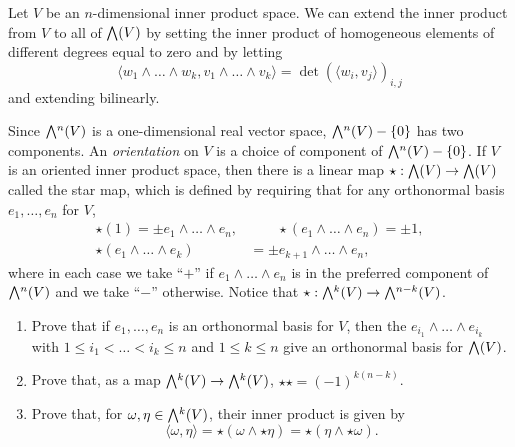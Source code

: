 \documentclass[12pt]{memoir}
\begin{document}
\begin{Ej}
    Let $V$ be an $n$-dimensional inner product space. We can extend the inner product from $V$ to all of $\exterior(V)$ by setting the inner product of homogeneous elements of different degrees equal to zero and by letting
	\[
		\langle w_1 \wedge \ldots \wedge w_k, v_1 \wedge \ldots \wedge v_k \rangle = \det \left(\langle w_i, v_j \rangle \right)_{i,j}
	\]
	and extending bilinearly. 
	
	Since $\exterior^n(V)$ is a one-dimensional real vector space, $\exterior^n(V) - \{0\}$ has two components. An \emph{orientation} on $V$ is a choice of component of $\exterior^n(V) - \{0\}$. If $V$ is an oriented inner product space, then there is a linear map $\star: \exterior(V) \to \exterior(V)$ called the star map, which is defined by requiring that for any orthonormal basis $e_1, \ldots , e_n$ for $V$,
	\begin{align*}
		\star(1) = \pm e_1 \wedge \ldots \wedge e_n,  & \qquad \star(e_1 \wedge \ldots \wedge e_n) = \pm 1, \\
		\star(e_1 \wedge \ldots \wedge e_k) & = \pm e_{k+1} \wedge \ldots \wedge e_n,
	\end{align*}
	where in each case we take ``$+$'' if $e_1 \wedge \ldots \wedge e_n$ is in the preferred component of $\exterior^n(V)$ and we take ``$-$'' otherwise. Notice that $\star: \exterior^k(V) \to \exterior^{n-k}(V)$.
	
	\begin{enumerate}
		\item Prove that if $e_1, \ldots , e_n$ is an orthonormal basis for $V$, then the $e_{i_1} \wedge \ldots \wedge e_{i_k}$ with $1 \leq i_1 < \ldots < i_k \leq n$ and $1 \leq k \leq n$ give an orthonormal basis for $\exterior(V)$.
		\item Prove that, as a map $\exterior^k(V) \to \exterior^k(V)$, $\star \star = (-1)^{k(n-k)}$.
		\item Prove that, for $\omega, \eta \in \exterior^k(V)$, their inner product is given by
		\[
			\langle \omega, \eta \rangle = \star (\omega \wedge \star \eta) = \star(\eta \wedge \star \omega).
		\]
	\end{enumerate}
\end{Ej}
\end{document}

